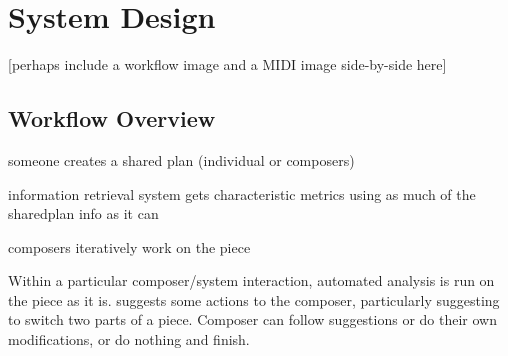 \documentclass[final,authoryear,11pt,times]{elsarticle}
\begin{document}







\section{System Design}

[perhaps include a workflow image and a MIDI image side-by-side here]

\subsection{Workflow Overview}

someone creates a shared plan (individual or composers)

information retrieval system gets characteristic metrics using as much of the sharedplan info as it can

composers iteratively work on the piece

Within a particular composer/system interaction, automated analysis is run on the piece as it is.
suggests some actions to the composer, particularly suggesting to switch two parts of a piece.
Composer can follow suggestions or do their own modifications, or do nothing and finish.
\end{document}
